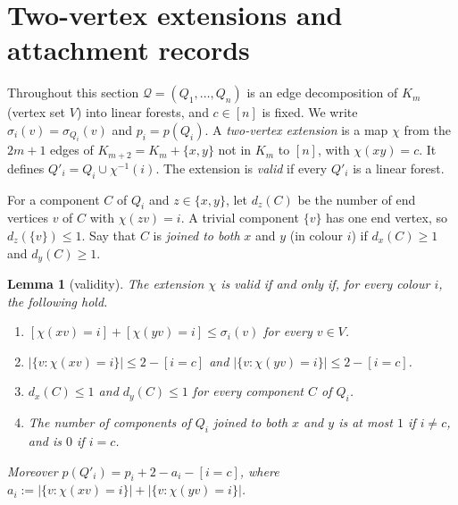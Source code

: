 \documentclass[11pt]{amsart}
\newtheorem{lemma}[theorem]{Lemma}
\theoremstyle{definition}
\theoremstyle{remark}
\newcommand{\Q}{\mathcal{Q}}
\begin{document}
\section{Two-vertex extensions and attachment records}\label{sec:reduction}

Throughout this section $\Q=(Q_1,\dots,Q_n)$ is an edge decomposition of $K_m$ (vertex set
$V$) into linear forests, and $c\in[n]$ is fixed. We write $\sigma_i(v)=\sigma_{Q_i}(v)$ and
$p_i=p(Q_i)$. A \emph{two-vertex extension} is a map $\chi$ from the $2m+1$ edges of
$K_{m+2}=K_m+\{x,y\}$ not in $K_m$ to $[n]$, with $\chi(xy)=c$. It defines
$Q'_i=Q_i\cup\chi^{-1}(i)$. The extension is \emph{valid} if every $Q'_i$ is a linear forest.

For a component $C$ of $Q_i$ and $z\in\{x,y\}$, let $d_z(C)$ be the number of end vertices
$v$ of $C$ with $\chi(zv)=i$. A trivial component $\{v\}$ has one end vertex, so
$d_z(\{v\})\le1$. Say that $C$ is \emph{joined to both} $x$ and $y$ (in colour $i$) if
$d_x(C)\ge1$ and $d_y(C)\ge1$.

\begin{lemma}[validity]\label{lem:valid}
The extension $\chi$ is valid if and only if, for every colour $i$, the following hold.
\begin{enumerate}[label=\textup{(V\arabic*)},leftmargin=*]
\item $[\chi(xv)=i]+[\chi(yv)=i]\le\sigma_i(v)$ for every $v\in V$.
\item $|\{v:\chi(xv)=i\}|\le 2-[i=c]$ and $|\{v:\chi(yv)=i\}|\le 2-[i=c]$.
\item $d_x(C)\le1$ and $d_y(C)\le1$ for every component $C$ of $Q_i$.
\item The number of components of $Q_i$ joined to both $x$ and $y$ is at most $1$ if
$i\ne c$, and is $0$ if $i=c$.
\end{enumerate}
Moreover $p(Q'_i)=p_i+2-a_i-[i=c]$, where
$a_i:=|\{v:\chi(xv)=i\}|+|\{v:\chi(yv)=i\}|$.
\end{lemma}
\end{document}
